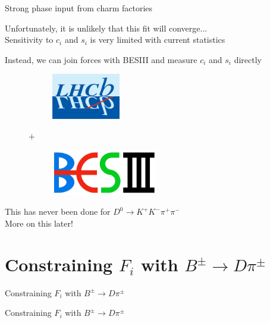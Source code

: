 \documentclass{beamer}
\begin{document}
\begin{frame}{Strong phase input from charm factories}
  \begin{center}
    \Large Unfortunately, it is unlikely that this fit will converge... \\
    \large Sensitivity to $c_i$ and $s_i$ is very limited with current statistics
  \end{center}
  \begin{center}
    Instead, we can join forces with BESIII and measure $c_i$ and $s_i$ directly
  \end{center}
  \begin{figure}
    \centering
    \begin{subfigure}{0.35\textwidth}
      \centering
      \includegraphics[height = 2cm]{lhcb.jpg}
    \end{subfigure}%
    {\Huge $+$}
    \begin{subfigure}{0.45\textwidth}
      \centering
      \includegraphics[height = 2cm]{bes3.jpg}
    \end{subfigure}
  \end{figure}
  \vspace{0.3cm}
  \begin{center}
    \large This has never been done for $D^0\to K^+K^-\pi^+\pi^-$\\
    \large More on this later!
  \end{center}
\end{frame}

\section{Constraining \texorpdfstring{$F_i$}{Fi} with \texorpdfstring{$B^\pm\to D\pi^\pm$}{B2Dpi}}
\begin{frame}{Constraining $F_i$ with $B^\pm\to D\pi^\pm$}
  \begin{center}
    {\huge Constraining $F_i$ with $B^\pm\to D\pi^\pm$}
  \end{center}
\end{frame}
\end{document}
